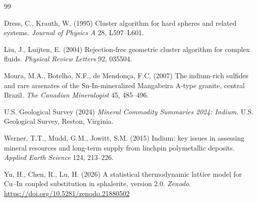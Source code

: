\documentclass[11pt,a4paper]{article}
\begin{document}
\begin{thebibliography}{99}
\itemsep2pt

Dress, C., Krauth, W. (1995) Cluster algorithm for hard spheres and related
systems. \textit{Journal of Physics A} 28, L597--L601.

Liu, J., Luijten, E. (2004) Rejection-free geometric cluster algorithm for
complex fluids. \textit{Physical Review Letters} 92, 035504.

Moura, M.A., Botelho, N.F., de Mendon\c{c}a, F.C. (2007) The indium-rich
sulfides and rare arsenates of the Sn-In-mineralized Mangabeira A-type granite,
central Brazil. \textit{The Canadian Mineralogist} 45, 485--496.

U.S. Geological Survey (2024) \textit{Mineral Commodity Summaries 2024:
Indium}. U.S. Geological Survey, Reston, Virginia.

Werner, T.T., Mudd, G.M., Jowitt, S.M. (2015) Indium: key issues in assessing
mineral resources and long-term supply from linchpin polymetallic deposits.
\textit{Applied Earth Science} 124, 213--226.

Yu, H., Chen, R., Lu, H. (2026) A statistical thermodynamic lattice model for
Cu--In coupled substitution in sphalerite, version 2.0. \textit{Zenodo}.
\url{https://doi.org/10.5281/zenodo.21880502}

\end{thebibliography}
\end{document}
